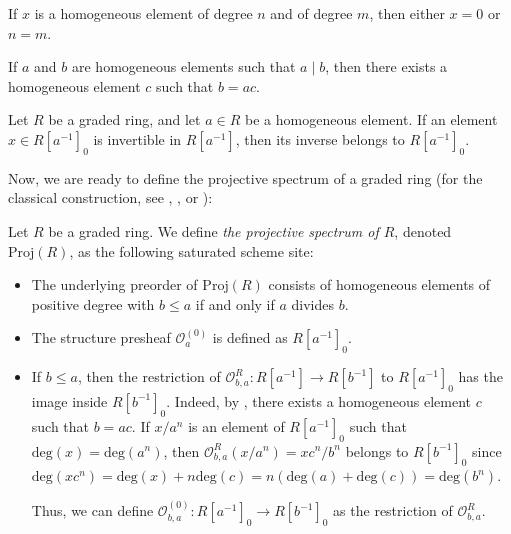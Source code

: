 \documentclass[reqno]{amsart}
\theoremstyle{definition}
\theoremstyle{remark}
\numberwithin{figure}{section}
\renewcommand{\deg}[1]{\mathrm{deg}(#1)}
\begin{document}
\begin{lem}
If $x$ is a homogeneous element of degree $n$ and of degree $m$, then either $x = 0$ or $n = m$.
\end{lem}

\begin{lem}
If $a$ and $b$ are homogeneous elements such that $a \mid b$, then there exists a homogeneous element $c$ such that $b = a c$.
\end{lem}

\begin{lem}
Let $R$ be a graded ring, and let $a \in R$ be a homogeneous element.
If an element $x \in R[a^{-1}]_0$ is invertible in $R[a^{-1}]$, then its inverse belongs to $R[a^{-1}]_0$.
\end{lem}
% 

Now, we are ready to define the projective spectrum of a graded ring (for the classical construction, see \cite[Section~2]{EGA2}, \cite[Section~II.2]{hartshorne}, or \cite[Tag~01M3]{stacks}):

\begin{example}[proj]
Let $R$ be a graded ring.
We define \emph{the projective spectrum of $R$}, denoted $\mathrm{Proj}(R)$, as the following saturated scheme site:
\begin{itemize}
\item The underlying preorder of $\mathrm{Proj}(R)$ consists of homogeneous elements of positive degree with $b \leq a$ if and only if $a$ divides $b$.
\item The structure presheaf $\mathcal{O}^{(0)}_a$ is defined as $R[a^{-1}]_0$.
\item If $b \leq a$, then the restriction of $\mathcal{O}^R_{b,a} : R[a^{-1}] \to R[b^{-1}]$ to $R[a^{-1}]_0$ has the image inside $R[b^{-1}]_0$.
Indeed, by , there exists a homogeneous element $c$ such that $b = a c$.
If $x/a^n$ is an element of $R[a^{-1}]_0$ such that $\deg{x} = \deg{a^n}$,
then $\mathcal{O}^R_{b,a}(x/a^n) = x c^n / b^n$ belongs to $R[b^{-1}]_0$ since $\deg{x c^n} = \deg{x} + n \deg{c} = n(\deg{a} + \deg{c}) = \deg{b^n}$.

Thus, we can define $\mathcal{O}^{(0)}_{b,a} : R[a^{-1}]_0 \to R[b^{-1}]_0$ as the restriction of $\mathcal{O}^R_{b,a}$.
\end{itemize}
\end{example}
\end{document}
